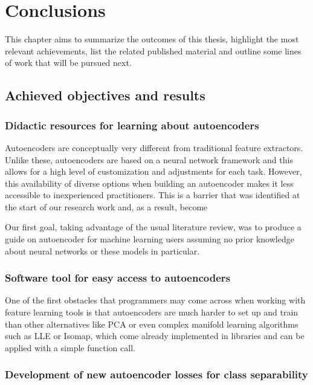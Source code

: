 \setchapterpreamble[u]{\margintoc}
\chapter{Conclusions}
\label{ch:conclusions}

This chapter aims to summarize the outcomes of this thesis, highlight the most relevant achievements, list the related published material and outline some lines of work that will be pursued next.

\section{Achieved objectives and results}

\subsection{Didactic resources for learning about autoencoders}

Autoencoders are conceptually very different from traditional feature extractors. Unlike these, autoencoders are based on a neural network framework and this allows for a high level of customization and adjustments for each task. However, this availability of diverse options when building an autoencoder makes it less accessible to inexperienced practitioners. This is a barrier that was identified at the start of our research work and, as a result, become 

Our first goal, taking advantage of the usual literature review, was to produce a guide on autoencoder for machine learning users assuming no prior knowledge about neural networks or these models in particular.

\subsection{Software tool for easy access to autoencoders}

One of the first obstacles that programmers may come across when working with feature learning tools is that autoencoders are much harder to set up and train than other alternatives like PCA or even complex manifold learning algorithms such as LLE or Isomap, which come already implemented in libraries and can be applied with a simple function call.


\subsection{Development of new autoencoder losses for class separability}

